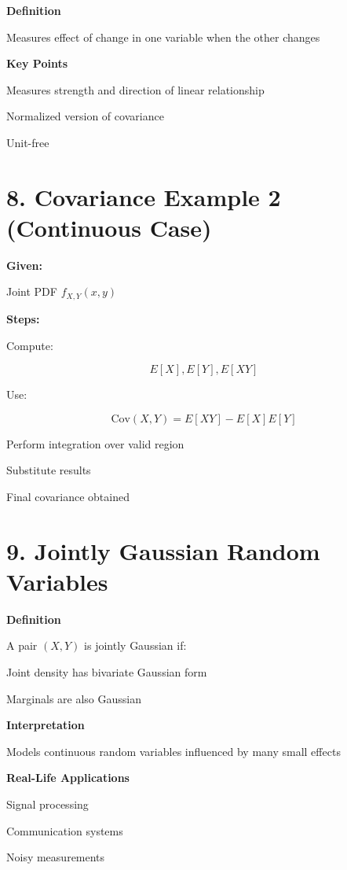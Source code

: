 \documentclass[12pt]{article}
\begin{document}
\textbf{Definition}

Measures effect of change in one variable when the other changes

\textbf{Key Points}

Measures strength and direction of linear relationship

Normalized version of covariance

Unit-free

\section*{8. Covariance Example 2 (Continuous Case)}

\textbf{Given:}

Joint PDF $f_{X,Y}(x,y)$

\textbf{Steps:}

Compute:

\[
E[X], E[Y], E[XY]
\]

Use:

\[
\text{Cov}(X,Y) = E[XY] - E[X]E[Y]
\]

Perform integration over valid region

Substitute results

Final covariance obtained

\section*{9. Jointly Gaussian Random Variables}

\textbf{Definition}

A pair $(X,Y)$ is jointly Gaussian if:

Joint density has bivariate Gaussian form

Marginals are also Gaussian

\textbf{Interpretation}

Models continuous random variables influenced by many small effects

\textbf{Real-Life Applications}

Signal processing

Communication systems

Noisy measurements
\end{document}
